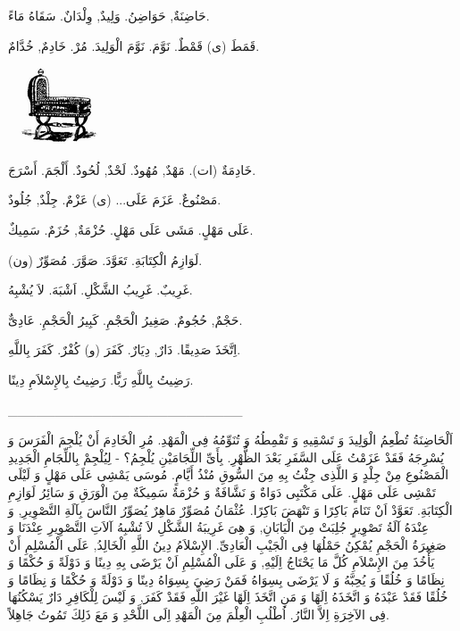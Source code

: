 \documentclass[a5paper]{article}
\begin{document}
حَاضِنَةٌ, حَوَاضِنُ. وَلِيدٌ, وِلْدَانٌ. سَقَاهُ مَاءً. 

قَمَطَ (ى) قَمْطٌ. نَوَّمَ. نَوَّمَ الْوَلِيدَ. مُرْ. خَادِمٌ, خُدَّامٌ.

\  \includegraphics[width=0.9898in,height=0.9063in]{MuhammadBagauddinlatinized-img272.png} 

خَادِمَةٌ (ات). مَهْدٌ, مُهُودٌ. لَحْدٌ, لُحُودٌ. أَلْجَمَ. أَسْرَجَ.

مَصْنُوعٌ. عَزَمَ عَلَى... (ى) عَزْمٌ. جِلْدٌ, جُلُودٌ.

عَلَى مَهْلٍ. مَشَى عَلَى مَهْلٍ. حُزْمَةٌ, حُزَمٌ. سَمِيكٌ.

لَوَازِمُ الْكِتَابَةِ. تَعَوَّدَ. صَوَّرَ. مُصَوِّرٌ (ون).

غَرِيبٌ. غَرِيبُ الشَّكْلِ. اَشْبَهَ. لاَ يُشْبِهُ. 

حَجْمٌ, حُجُومٌ. صَغِيرُ الْحَجْمِ. كَبِيرُ الْحَجْمِ. عَادِىٌّ.

اِتَّخَذَ صَدِيقًا. دَارٌ, دِيَارٌ. كَفَرَ (و) كُفْرٌ. كَفَرَ بِاللَّهِ.

رَضِيتُ بِاللَّهِ رَبًّا. رَضِيتُ بِالإِسْلاَمِ دِينًا.

\_\_\_\_\_\_\_\_\_\_\_\_\_\_\_\_\_\_\_\_\_\_\_\_\_

اَلْحَاضِنَةُ تُطْعِمُ الْوَلِيدَ وَ تَسْقِيهِ وَ تَقْمِطُهُ وَ تُنَوِّمُهُ فِى الْمَهْدِ. مُرِ الْخَادِمَ أَنْ يُلْجِمَ الْفَرَسَ وَ يُسْرِجَهُ فَقَدْ عَزَمْتُ عَلَى السَّفَرِ بَعْدَ الظُّهْرِ. بِأَىِّ اللِّجَامَيْنِ يُلْجِمُ؟ - لِيُلْجِمْ بِاللِّجَامِ الْجَدِيدِ الْمَصْنُوعِ مِنْ جِلْدٍ وَ اللَّذِى جِئْتُ بِهِ مِنَ السُّوقِ مُنْذُ أَيَّامٍ. مُوسَى يَمْشِى عَلَى مَهْلٍ وَ لَيْلَى تَمْشِى عَلَى مَهْلٍ. عَلَى مَكْتَبِى دَوَاةٌ وَ نَشَّافَةٌ وَ حُزْمَةٌ سَمِيكَةٌ مِنَ الْوَرَقِ وَ سَائِرُ لَوَازِمِ الْكِتَابَةِ. تَعَوَّدْ اَنْ تَنَامَ بَاكِرًا وَ تَنْهَضَ بَاكِرًا. عُثْمَانُ مُصَوِّرٌ مَاهِرٌ يُصَوِّرُ النَّاسَ بِآلَةِ التَّصْوِيرِ, وَ عِنْدَهُ آلَةُ تَصْوِيرٍ جُلِبَتْ مِنَ الْيَابَانِ, وَ هِىَ غَرِيبَةُ الشَّكْلِ لاَ تُشْبِهُ آلاَتِ التَّصْوِيرِ عِنْدَنَا وَ صَغِيرَةُ الْحَجْمِ يُمْكِنُ حَمْلُهَا فِى الْجَيْبِ الْعَادِىِّ. الإِسْلاَمُ دِينُ اللَّهِ الْخَالِدُ, عَلَى الْمُسْلِمِ أَنْ يَأْخُذَ مِنَ الإِسْلاَمِ كُلَّ مَا يَحْتَاجُ اِلَيْهِ, وَ عَلَى الْمُسْلِمِ اَنْ يَرْضَى بِهِ دِينًا وَ دَوْلَةً وَ حُكْمًا وَ نِظَامًا وَ خُلُقًا وَ يُحِبَّهُ وَ لَا يَرْضَى بِسِوَاهُ فَمَنْ رَضِيَ بِسِوَاهُ دِينًا وَ دَوْلَةً وَ حُكْمًا وَ نِظَامًا وَ خُلُقًا فَقَدْ عَبْدَهُ وَ اتَّخَذَهُ اِلَهًا وَ مَنِ اتَّخَذَ اِلَهًا غَيْرَ اللَّهِ فَقَدْ كَفَرَ, وَ لَيْسَ لِلْكَافِرِ دَارٌ يَسْكُنُهَا فِى الآخِرَةِ اِلاَّ النَّارُ. اُطْلُبِ الْعِلْمَ مِنَ الْمَهْدِ اِلَى اللَّحْدِ وَ مَعَ ذَلِكَ تَمُوتُ جَاهِلاً.
\end{document}
